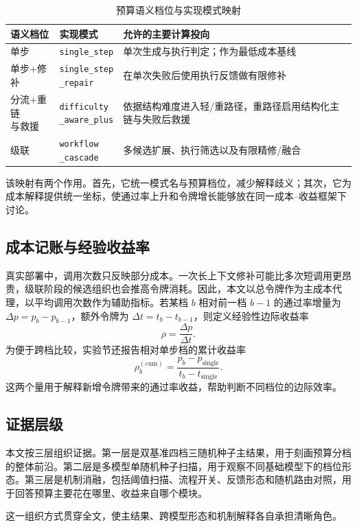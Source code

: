 \begin{table}[H]
\centering
\scriptsize
\setlength{\tabcolsep}{3pt}
\caption{预算语义档位与实现模式映射}
\label{tab:tier_mapping}
\begin{tabularx}{\linewidth}{@{}p{1.15cm} p{2.1cm} X@{}}
\toprule
语义档位 & 实现模式 & 允许的主要计算投向 \\
\midrule
单步 & \texttt{single\_step} & 单次生成与执行判定；作为最低成本基线 \\
单步+修补 & \makecell[l]{\texttt{single\_step}\\\texttt{\_repair}} & 在单次失败后使用执行反馈做有限修补 \\
\makecell[l]{分流+重链\\与救援} & \makecell[l]{\texttt{difficulty}\\\texttt{\_aware\_plus}} & 依据结构难度进入轻/重路径，重路径启用结构化主链与失败后救援 \\
级联 & \makecell[l]{\texttt{workflow}\\\texttt{\_cascade}} & 多候选扩展、执行筛选以及有限精修/融合 \\
\bottomrule
\end{tabularx}
\end{table}

该映射有两个作用。首先，它统一模式名与预算档位，减少解释歧义；其次，它为成本解释提供统一坐标，使通过率上升和令牌增长能够放在同一成本--收益框架下讨论。

\subsection{成本记账与经验收益率}
\label{sec:accounting}

真实部署中，调用次数只反映部分成本。一次长上下文修补可能比多次短调用更昂贵，级联阶段的候选组织也会推高令牌消耗。因此，本文以总令牌作为主成本代理，以平均调用次数作为辅助指标。若某档 $b$ 相对前一档 $b-1$ 的通过率增量为 $\Delta p=p_b-p_{b-1}$，额外令牌为 $\Delta t=t_b-t_{b-1}$，则定义经验性边际收益率
\begin{equation}
    \rho = \frac{\Delta p}{\Delta t}.
\end{equation}
为便于跨档比较，实验节还报告相对单步档的累计收益率
\begin{equation}
    \rho_b^{(\mathrm{cum})}=
    \frac{p_b-p_{\mathrm{single}}}{t_b-t_{\mathrm{single}}}.
\end{equation}
这两个量用于解释新增令牌带来的通过率收益，帮助判断不同档位的边际效率。

\subsection{证据层级}
\label{sec:evidence-levels}

本文按三层组织证据。第一层是双基准四档三随机种子主结果，用于刻画预算分档的整体前沿。第二层是多模型单随机种子扫描，用于观察不同基础模型下的档位形态。第三层是机制消融，包括阈值扫描、流程开关、反馈形态和随机路由对照，用于回答预算主要花在哪里、收益来自哪个模块。

这一组织方式贯穿全文，使主结果、跨模型形态和机制解释各自承担清晰角色。
